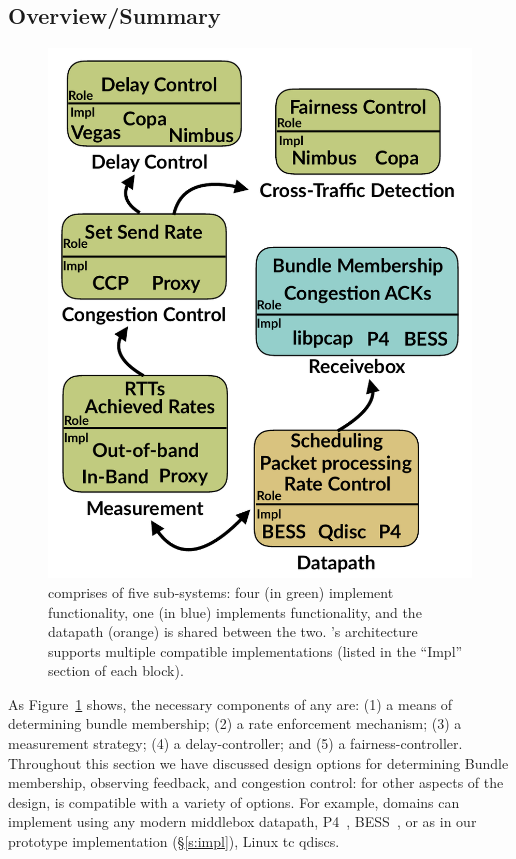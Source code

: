 \subsection{Overview/Summary}
\begin{figure}
    \centering
    \includegraphics[width=\columnwidth]{img/arch-block-diag}
    \caption{\name comprises of five sub-systems: four (in green) implement \inbox functionality, one (in blue) implements \outbox functionality, and the datapath (orange) is shared between the two. \name's architecture supports multiple compatible implementations (listed in the ``Impl'' section of each block).}\label{fig:design:block-diag}
\end{figure}
As Figure~\ref{fig:design:block-diag} shows, the necessary components of any \name are: (1) a means of determining bundle membership; (2) a rate enforcement mechanism; (3) a measurement strategy; (4) a delay-controller; and (5) a fairness-controller.
Throughout this section we have discussed design options for determining Bundle membership, observing feedback, and congestion control: for other aspects of the design, \name is compatible with a variety of options. For example, domains can implement \name using any modern middlebox datapath, \eg P4~\cite{p4}, BESS~\cite{bess}, or as in our prototype implementation (\S\ref{s:impl}), Linux tc qdiscs.
